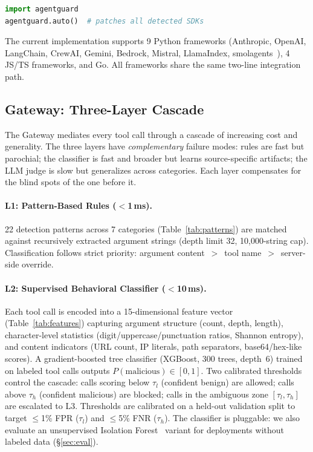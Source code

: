 \documentclass[sigplan,review,anonymous]{acmart}
\begin{document}
\begin{lstlisting}[language=Python, basicstyle=\scriptsize\ttfamily]
import agentguard
agentguard.auto()  # patches all detected SDKs
\end{lstlisting}

\noindent The current implementation supports 9 Python frameworks (Anthropic, OpenAI, LangChain, CrewAI, Gemini, Bedrock, Mistral, LlamaIndex, smolagents~\cite{smolagents2024}), 4 JS/TS frameworks, and Go. All frameworks share the same two-line integration path.

\subsection{Gateway: Three-Layer Cascade}
\label{gateway}

The Gateway mediates every tool call through a cascade of increasing cost and generality.
The three layers have \emph{complementary} failure modes: rules are fast but parochial; the classifier is fast and broader but learns source-specific artifacts; the LLM judge is slow but generalizes across categories.
Each layer compensates for the blind spots of the one before it.

\paragraph{L1: Pattern-Based Rules ($<$1\,ms).}
22 detection patterns across 7 categories (Table~\ref{tab:patterns}) are matched against recursively extracted argument strings (depth limit 32, 10{,}000-string cap). Classification follows strict priority: argument content~$>$~tool name~$>$~server-side override.

\paragraph{L2: Supervised Behavioral Classifier ($<$10\,ms).}
Each tool call is encoded into a 15-dimensional feature vector (Table~\ref{tab:features}) capturing argument structure (count, depth, length), character-level statistics (digit/uppercase/punctuation ratios, Shannon entropy), and content indicators (URL count, IP literals, path separators, base64/hex-like scores). A gradient-boosted tree classifier (XGBoost, 300 trees, depth~6) trained on labeled tool calls outputs $P(\text{malicious}) \in [0,1]$. Two calibrated thresholds control the cascade: calls scoring below $\tau_l$ (confident benign) are allowed; calls above $\tau_h$ (confident malicious) are blocked; calls in the ambiguous zone $[\tau_l, \tau_h]$ are escalated to L3. Thresholds are calibrated on a held-out validation split to target $\le$1\% FPR ($\tau_l$) and $\le$5\% FNR ($\tau_h$). The classifier is pluggable: we also evaluate an unsupervised Isolation Forest~\cite{zhao2019pyod} variant for deployments without labeled data (\S\ref{sec:eval}).
\end{document}
